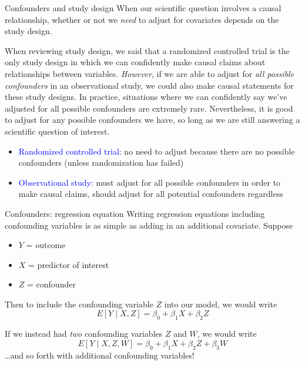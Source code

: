 \documentclass[10pt,t]{beamer}
\begin{document}
\begin{frame}{Confounders and study design}
	\vspace{-0.3cm}
When our scientific question involves a causal relationship, whether or not we \textit{need} to adjust for covariates depends on the study design.

\vspace{0.3cm}

When reviewing study design, we said that a randomized controlled trial is the only study design in which we can confidently make causal claims about relationships between variables. \textit{However}, if we are able to adjust for \textit{all possible confounders} in an observational study, we could also make causal statements for these study designs. In practice, situations where we can confidently say we've adjusted for all possible confounders are extremely rare. Nevertheless, it is good to adjust for any possible confounders we have, so long as we are still answering a scientific question of interest. \pause

\vspace{0.3cm}

\begin{itemize}
	\item \textcolor{blue}{Randomized controlled trial:} no need to adjust because there are no possible confounders (unless randomization has failed)
	\item \textcolor{blue}{Observational study:} must adjust for all possible confounders in order to make causal claims, should adjust for all potential confounders regardless
\end{itemize}
\end{frame}

\begin{frame}{Confounders: regression equation}
Writing regression equations including confounding variables is as simple as adding in an additional covariate. Suppose

\vspace{0.3cm}

\begin{itemize}
	\item $Y$ = outcome
	\item $X$ = predictor of interest
	\item $Z$ = confounder
\end{itemize}

\vspace{0.3cm}

Then to include the confounding variable $Z$ into our model, we would write
$$
E[Y \mid X, Z] = \beta_0 + \beta_1 X + \beta_2 Z
$$

If we instead had \textit{two} confounding variables $Z$ and $W$, we would write
$$
E[Y \mid X, Z, W] = \beta_0 + \beta_1 X + \beta_2 Z + \beta_3 W
$$
\dots and so forth with additional confounding variables!

\end{frame}
\end{document}
